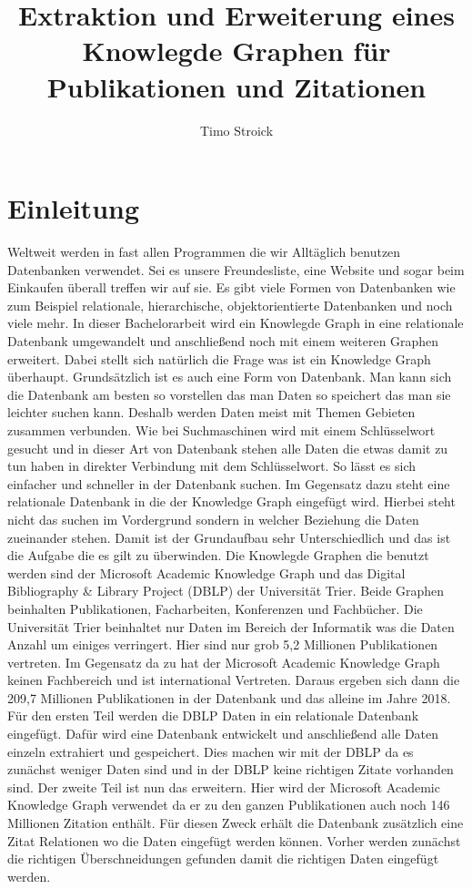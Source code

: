 \documentclass[a4paper,12pt]{article}
\begin{document}
	\title{Extraktion und Erweiterung eines Knowlegde Graphen für Publikationen und Zitationen}
	\author{Timo Stroick}
	\maketitle
	\tableofcontents
	\section{Einleitung}
	Weltweit werden in fast allen Programmen die wir Alltäglich benutzen Datenbanken verwendet. Sei es unsere Freundesliste, eine Website und sogar beim Einkaufen überall treffen wir auf sie. Es gibt viele Formen von Datenbanken wie zum Beispiel relationale, hierarchische, objektorientierte Datenbanken und noch viele mehr. In dieser Bachelorarbeit wird ein Knowlegde Graph in eine relationale Datenbank umgewandelt und anschließend noch mit einem weiteren Graphen erweitert. Dabei stellt sich natürlich die Frage was ist ein Knowledge Graph überhaupt. Grundsätzlich ist es auch eine Form von Datenbank. Man kann sich die Datenbank am besten so vorstellen das man Daten so speichert das man sie leichter suchen kann. Deshalb werden Daten meist mit Themen Gebieten zusammen verbunden. Wie bei Suchmaschinen wird mit einem Schlüsselwort gesucht und in dieser Art von Datenbank stehen alle Daten die etwas damit zu tun haben in direkter Verbindung mit dem Schlüsselwort. So lässt es sich einfacher und schneller in der Datenbank suchen. Im Gegensatz dazu steht eine relationale Datenbank in die der Knowledge Graph eingefügt wird. Hierbei steht nicht das suchen im Vordergrund sondern in welcher Beziehung die Daten zueinander stehen. Damit ist der Grundaufbau sehr Unterschiedlich und das ist die Aufgabe die es gilt zu überwinden. Die Knowlegde Graphen die benutzt werden sind der Microsoft Academic Knowledge Graph und das Digital Bibliography \& Library Project (DBLP) der Universität Trier. Beide Graphen beinhalten Publikationen, Facharbeiten, Konferenzen und Fachbücher. Die Universität Trier beinhaltet nur Daten im Bereich der Informatik was die Daten Anzahl um einiges verringert. Hier sind nur grob 5,2 Millionen Publikationen vertreten. Im Gegensatz da zu hat der Microsoft Academic Knowledge Graph keinen Fachbereich und ist international Vertreten. Daraus ergeben sich dann die 209,7 Millionen Publikationen in der Datenbank und das alleine im Jahre 2018. Für den ersten Teil werden die DBLP Daten in ein relationale Datenbank eingefügt. Dafür wird eine Datenbank entwickelt und anschließend alle Daten einzeln extrahiert und gespeichert. Dies machen wir mit der DBLP da es zunächst weniger Daten sind und in der DBLP keine richtigen Zitate vorhanden sind. Der zweite Teil ist nun das erweitern. Hier wird der Microsoft Academic Knowledge Graph verwendet da er zu den ganzen Publikationen auch noch 146 Millionen Zitation enthält. Für diesen Zweck erhält die Datenbank zusätzlich eine Zitat Relationen wo die Daten eingefügt werden können. Vorher werden zunächst die richtigen Überschneidungen gefunden damit die richtigen Daten eingefügt werden.
	
\end{document}
